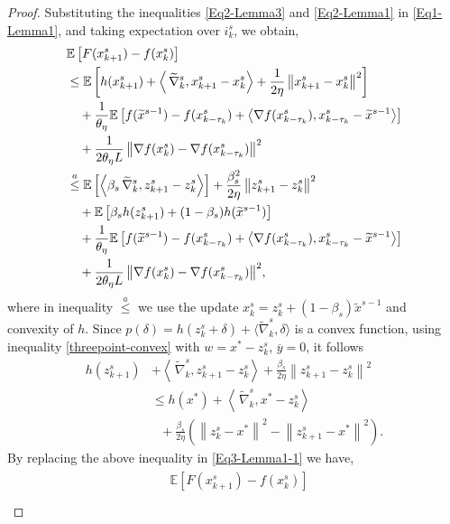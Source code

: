 \documentclass[conference]{IEEEtran}
\newcommand*{\E}{\mathbb{E}}
\newcommand*{\VRG}{\,\widetilde{\nabla}_k^s}
\newcommand{\norm}[1]{\left\lVert#1\right\rVert}
\newcommand{\Iprod}[2]{\left\langle #1,#2\right\rangle}
\theoremstyle{definition}
\theoremstyle{remark}
\begin{document}
\begin{proof}
Substituting the inequalities \eqref{Eq2-Lemma3} and \eqref{Eq2-Lemma1} in \eqref{Eq1-Lemma1}, and taking expectation over $i ^s_k$, we obtain,
\begin{gather}\label{Eq3-Lemma1-1}
\begin{split}
&\E \left[ F(x_{k+1}^s) -f(x_{k}^s)\right]\\
&\leq \E\left[h(x_{k+1}^s)+ \Iprod{\VRG}{x_{k+1}^s-x_{k}^s}+{\frac{1}{2\eta}}\norm{x_{k+1}^s-x_{k}^s}^2\right]\\
&~~~+\frac{1}{\theta_{\eta}}\E\left[f(\widetilde{x}^{s-1})-f(x_{k-\tau_k}^s)+\Iprod{\nabla f(x_{k-\tau_k}^s)}{x_{k-\tau_k}^s-\widetilde{x}^{s-1}}\right]\\&
~~~+{\frac{1}{2 \theta_{\eta} L} \norm{\nabla f(x_{k}^s)-\nabla f(x_{k-\tau_k}^s)}^2}\\
&\stackrel{a}{\leq}\E\left[\Iprod{\beta_s\VRG}{z_{k+1}^s-z_{k}^s}\right]+{\frac{ \beta_s^2}{2\eta}}\norm{z_{k+1}^s-z_{k}^s}^2\\
&~~~+\E\left[\beta_s h(z_{k+1}^s)+(1-\beta_s) h(\widetilde{x}^{s-1})\right]\\
&~~~+\frac{1}{\theta_{\eta}}\E\left[f(\widetilde{x}^{s-1})-f(x_{k-\tau_k}^s)+\Iprod{\nabla f(x_{k-\tau_k}^s)}{x_{k-\tau_k}^s-\widetilde{x}^{s-1}}\right]\\
&~~~+{\frac{1}{2 \theta_{\eta} L} \norm{\nabla f(x_{k}^s)-\nabla f(x_{k-\tau_k}^s)}^2},
\end{split}
\raisetag{15pt}
\end{gather}
where in inequality $\stackrel{a}{\leq}$ we use the update $x_k^s = z_k^s+(1-\beta_s)\widetilde{x}^{s-1}$ and convexity of $h$. Since   $p(\delta) = h(z_k^s+\delta)+\langle\widetilde{\nabla}_k^s,\delta\rangle$ is a convex function, using inequality \eqref{threepoint-convex} with $w=x^*-z_{k}^s$, $\overline{y} = 0$, it follows
\begin{equation}
\begin{split}
h(z_{k+1}^s) &+ \Iprod{\VRG}{z_{k+1}^s-z_{k}^s}+{\frac{\beta_s}{2\eta}}\norm{z_{k+1}^s-z_{k}^s}^2  \\
&\leq h(x^*)+\Iprod{\VRG}{x^* - z_{k}^s}\\
&~~~+{\frac{\beta_s}{2\eta}}(\norm{z_{k}^s-x^*}^2-\norm{z_{k+1}^s-x^*}^2).  
\end{split}
\end{equation}
By replacing the above inequality in \eqref{Eq3-Lemma1-1} we have,
\begin{gather}\label{Eq3-Lemma1I}
\begin{split}
&\E\left[F(x_{k+1}^s) -f(x_{k}^s)\right]\\

\end{split}
\end{gather}
\end{proof}
\end{document}
